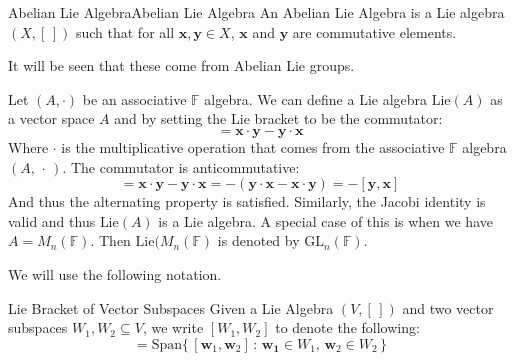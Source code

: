 \documentclass[crop=false,class=article]{standalone}                           %
\begin{document}
        \begin{fdefinition}{Abelian Lie Algebra}{Abelian Lie Algebra}
            An Abelian Lie Algebra is a Lie algebra $(X,[\,])$ such that for
            all $\mathbf{x},\mathbf{y}\in{X}$, $\mathbf{x}$ and $\mathbf{y}$
            are commutative elements.
        \end{fdefinition}
        It will be seen that these come from Abelian Lie groups.
        \begin{lexample}{}{}
            Let $(A,\cdot)$ be an associative $\mathbb{F}$ algebra. We can
            define a Lie algebra $\textrm{Lie}(A)$ as a vector space
            $A$ and by setting the Lie bracket to be the commutator:
            \begin{equation}
                [\mathbf{x},\mathbf{y}]
                =\mathbf{x}\cdot\mathbf{y}-\mathbf{y}\cdot\mathbf{x}
            \end{equation}
            Where $\cdot$ is the multiplicative operation that comes from the
            associative $\mathbb{F}$ algebra $(A,\,\cdot\,)$.
            The commutator is anticommutative:
            \begin{equation}
                [\mathbf{x},\mathbf{y}]
                =\mathbf{x}\cdot\mathbf{y}-\mathbf{y}\cdot\mathbf{x}
                =\minus(\mathbf{y}\cdot\mathbf{x}-\mathbf{x}\cdot\mathbf{y})
                =\minus[\mathbf{y},\mathbf{x}]
            \end{equation}
            And thus the alternating property is satisfied. Similarly, the
            Jacobi identity is valid and thus $\textrm{Lie}(A)$ is a Lie
            algebra. A special case of this is when we have
            $A=M_{n}(\mathbb{F})$. Then $\textrm{Lie}(M_{n}(\mathbb{F})$ is
            denoted by $\textrm{GL}_{n}(\mathbb{F})$.
        \end{lexample}
        We will use the following notation.
        \begin{fnotation}{Lie Bracket of Vector Subspaces}{}
            Given a Lie Algebra $(V,[\,])$ and two vector subspaces
            $W_{1},W_{2}\subseteq{V}$, we write $[W_{1},W_{2}]$ to
            denote the following:
            \begin{equation}
                [W_{1},W_{2}]=\textrm{Span}\big\{\,
                [\mathbf{w}_{1},\mathbf{w}_{2}]\,:\,
                    \mathbf{w_{1}}\in{W}_{1},\,\mathbf{w}_{2}\in{W}_{2}\,\big\}
            \end{equation}
        \end{fnotation}
\end{document}
